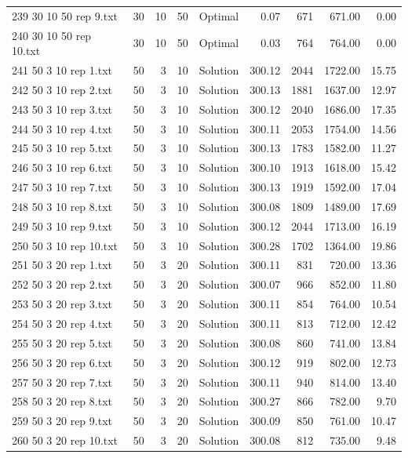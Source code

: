 \begin{longtable}{lrrllrrrr}
239 30 10 50 rep 9.txt & 30 & 10 & 50 & Optimal &  0.07 & 671 & 671.00 &  0.00\\
240 30 10 50 rep 10.txt & 30 & 10 & 50 & Optimal &  0.03 & 764 & 764.00 &  0.00\\
241 50 3 10 rep 1.txt & 50 & 3 & 10 & Solution & 300.12 & 2044 & 1722.00 & 15.75\\
242 50 3 10 rep 2.txt & 50 & 3 & 10 & Solution & 300.13 & 1881 & 1637.00 & 12.97\\
243 50 3 10 rep 3.txt & 50 & 3 & 10 & Solution & 300.12 & 2040 & 1686.00 & 17.35\\
244 50 3 10 rep 4.txt & 50 & 3 & 10 & Solution & 300.11 & 2053 & 1754.00 & 14.56\\
245 50 3 10 rep 5.txt & 50 & 3 & 10 & Solution & 300.13 & 1783 & 1582.00 & 11.27\\
246 50 3 10 rep 6.txt & 50 & 3 & 10 & Solution & 300.10 & 1913 & 1618.00 & 15.42\\
247 50 3 10 rep 7.txt & 50 & 3 & 10 & Solution & 300.13 & 1919 & 1592.00 & 17.04\\
248 50 3 10 rep 8.txt & 50 & 3 & 10 & Solution & 300.08 & 1809 & 1489.00 & 17.69\\
249 50 3 10 rep 9.txt & 50 & 3 & 10 & Solution & 300.12 & 2044 & 1713.00 & 16.19\\
250 50 3 10 rep 10.txt & 50 & 3 & 10 & Solution & 300.28 & 1702 & 1364.00 & 19.86\\
251 50 3 20 rep 1.txt & 50 & 3 & 20 & Solution & 300.11 & 831 & 720.00 & 13.36\\
252 50 3 20 rep 2.txt & 50 & 3 & 20 & Solution & 300.07 & 966 & 852.00 & 11.80\\
253 50 3 20 rep 3.txt & 50 & 3 & 20 & Solution & 300.11 & 854 & 764.00 & 10.54\\
254 50 3 20 rep 4.txt & 50 & 3 & 20 & Solution & 300.11 & 813 & 712.00 & 12.42\\
255 50 3 20 rep 5.txt & 50 & 3 & 20 & Solution & 300.08 & 860 & 741.00 & 13.84\\
256 50 3 20 rep 6.txt & 50 & 3 & 20 & Solution & 300.12 & 919 & 802.00 & 12.73\\
257 50 3 20 rep 7.txt & 50 & 3 & 20 & Solution & 300.11 & 940 & 814.00 & 13.40\\
258 50 3 20 rep 8.txt & 50 & 3 & 20 & Solution & 300.27 & 866 & 782.00 &  9.70\\
259 50 3 20 rep 9.txt & 50 & 3 & 20 & Solution & 300.09 & 850 & 761.00 & 10.47\\
260 50 3 20 rep 10.txt & 50 & 3 & 20 & Solution & 300.08 & 812 & 735.00 &  9.48\\

\end{longtable}
